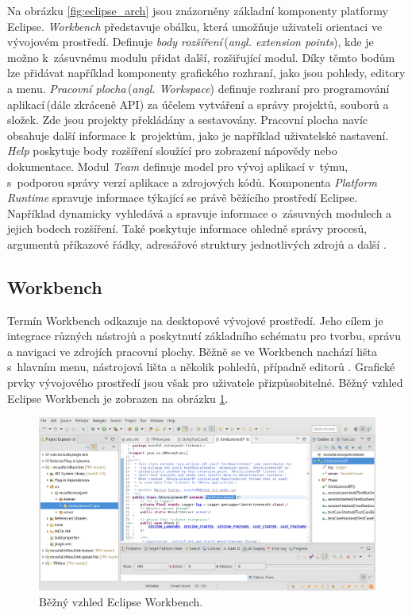   Na obrázku \ref{fig:eclipse_arch} jsou znázorněny základní komponenty platformy Eclipse. \emph{Workbench} představuje obálku, která umožňuje uživateli orientaci ve vývojovém prostředí. Definuje \emph{body rozšíření}\,(\emph{angl. extension points}), kde je možno k~zásuvnému modulu přidat další, rozšiřující modul. Díky těmto bodům lze přidávat například komponenty grafického rozhraní, jako jsou pohledy, editory a menu. \emph{Pracovní plocha}\,(\emph{angl. Workspace}) definuje rozhraní pro programování aplikací\,(dále zkráceně API) za účelem vytváření a správy projektů, souborů a složek. Zde jsou projekty překládány a sestavovány. Pracovní plocha navíc obsahuje další informace k~projektům, jako je například uživatelské nastavení. \emph{Help} poskytuje body rozšíření sloužící pro zobrazení nápovědy nebo dokumentace. Modul \emph{Team} definuje model pro vývoj aplikací v~týmu, s~podporou správy verzí aplikace a zdrojových kódů. Komponenta \emph{Platform Runtime} spravuje informace týkající se právě běžícího prostředí Eclipse. Například dynamicky vyhledává a spravuje informace o~zásuvných modulech a jejich bodech rozšíření. Také poskytuje informace ohledně správy procesů, argumentů příkazové řádky, adresářové struktury jednotlivých zdrojů a další \cite{Plugins}.

    \subsection{Workbench}
    Termín Workbench odkazuje na desktopové vývojové prostředí. Jeho cílem je integrace různých nástrojů a poskytnutí základního schématu pro tvorbu, správu a navigaci ve zdrojích pracovní plochy. Běžně se ve Workbench nachází lišta s~hlavním menu, nástrojová lišta a několik pohledů, případně editorů \cite{eclipse-workbench}. Grafické prvky vývojového prostředí jsou však pro uživatele přizpůsobitelné. Běžný vzhled Eclipse Workbench je zobrazen na obrázku \ref{fig:eclipse_workbench}.

    \begin{figure}
      \includegraphics[width=\textwidth, keepaspectratio, center]{obrazky-figures/eclipse_workbench.png}
      \caption{Běžný vzhled Eclipse Workbench.}
      \label{fig:eclipse_workbench}
    \end{figure}

